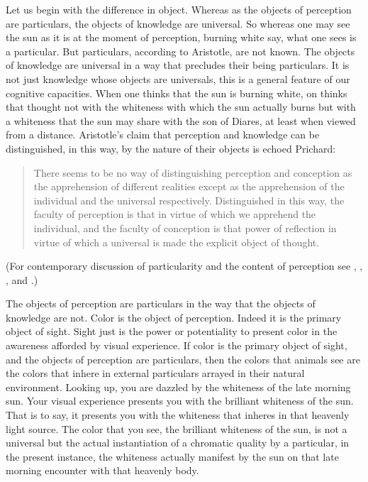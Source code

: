 Let us begin with the difference in object. Whereas as the objects of perception are particulars, the objects of knowledge are universal. So whereas one may see the sun as it is at the moment of perception, burning white say, what one sees is a particular. But particulars, according to Aristotle, are not known. The objects of knowledge are universal in a way that precludes their being particulars. It is not just knowledge whose objects are universals, this is a general feature of our cognitive capacities. When one thinks that the sun is burning white, on thinks that thought not with the whiteness with which the sun actually burns but with a whiteness that the sun may share with the son of Diares, at least when viewed from a distance. Aristotle's claim that perception and knowledge can be distinguished, in this way, by the nature of their objects is echoed Prichard:
% 	
\begin{quote}
	There seems to be no way of distinguishing perception and conception as the apprehension of different realities except as the apprehension of the individual and the universal respectively. Distinguished in this way, the faculty of perception is that in virtue of which we apprehend the individual, and the faculty of conception is that power of reflection in virtue of which a universal is made the explicit object of thought. \citep[]{Prichard:1909yg}
\end{quote}
(For contemporary discussion of particularity and the content of perception see \citealt{Brewer:2008fk}, \citealt{Martin:2002jb}, \citealt{Soteriou:2000iz,Soteriou:2005fk}, and \citealt{Travis:2005ys}.)

The objects of perception are particulars in the way that the objects of knowledge are not. Color is the object of perception. Indeed it is the primary object of sight. Sight just is the power or potentiality to present color in the awareness afforded by visual experience. If color is the primary object of sight, and the objects of perception are particulars, then the colors that animals see are the colors that inhere in external particulars arrayed in their natural environment. Looking up, you are dazzled by the whiteness of the late morning sun. Your visual experience presents you with the brilliant whiteness of the sun. That is to say, it presents you with the whiteness that inheres in that heavenly light source. The color that you see, the brilliant whiteness of the sun, is not a universal but the actual instantiation of a chromatic quality by a particular, in the present instance, the whiteness actually manifest by the sun on that late morning encounter with that heavenly body.

